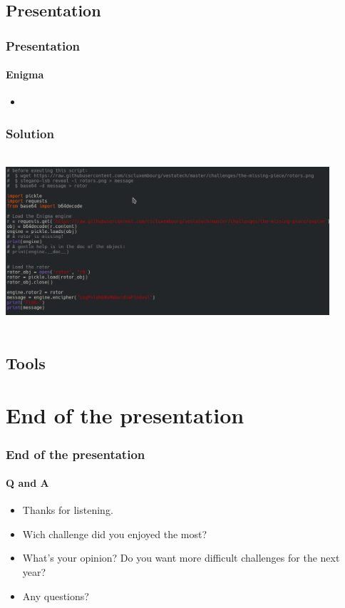\documentclass[]{beamer}
\begin{document}
\subsection{Presentation}
\begin{frame}
\frametitle{Presentation}
\framesubtitle{Enigma}
\begin{itemize}
    \item 
\end{itemize}
\end{frame}



\begin{frame}
\frametitle{Solution}
\begin{center}
    \includegraphics[height=6.5cm, width=12.0cm]{./images/Enigma_solution.png}
\end{center}
\end{frame}



\subsection{Tools}





%
%
\section*{End of the presentation}
\begin{frame}
    \frametitle{End of the presentation}
    \framesubtitle{Q and A}
    \begin{center}
        \begin{itemize}
            \item Thanks for listening.
            \item Wich challenge did you enjoyed the most?
            \item What's your opinion? Do you want more difficult challenges for the next year?
            \item Any questions?
        \end{itemize}
    \end{center}
\end{frame}
\end{document}

